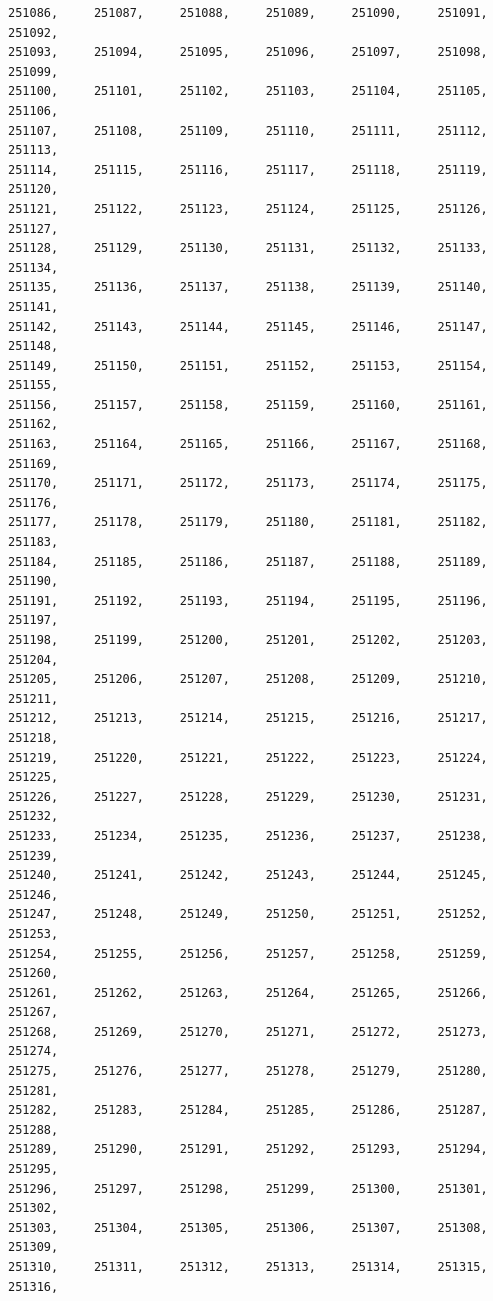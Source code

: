 \documentclass[a4paper,11pt]{report}
\begin{document}
\begin{verbatim}
251086,     251087,     251088,     251089,     251090,     251091,     251092,
251093,     251094,     251095,     251096,     251097,     251098,     251099,
251100,     251101,     251102,     251103,     251104,     251105,     251106,
251107,     251108,     251109,     251110,     251111,     251112,     251113,
251114,     251115,     251116,     251117,     251118,     251119,     251120,
251121,     251122,     251123,     251124,     251125,     251126,     251127,
251128,     251129,     251130,     251131,     251132,     251133,     251134,
251135,     251136,     251137,     251138,     251139,     251140,     251141,
251142,     251143,     251144,     251145,     251146,     251147,     251148,
251149,     251150,     251151,     251152,     251153,     251154,     251155,
251156,     251157,     251158,     251159,     251160,     251161,     251162,
251163,     251164,     251165,     251166,     251167,     251168,     251169,
251170,     251171,     251172,     251173,     251174,     251175,     251176,
251177,     251178,     251179,     251180,     251181,     251182,     251183,
251184,     251185,     251186,     251187,     251188,     251189,     251190,
251191,     251192,     251193,     251194,     251195,     251196,     251197,
251198,     251199,     251200,     251201,     251202,     251203,     251204,
251205,     251206,     251207,     251208,     251209,     251210,     251211,
251212,     251213,     251214,     251215,     251216,     251217,     251218,
251219,     251220,     251221,     251222,     251223,     251224,     251225,
251226,     251227,     251228,     251229,     251230,     251231,     251232,
251233,     251234,     251235,     251236,     251237,     251238,     251239,
251240,     251241,     251242,     251243,     251244,     251245,     251246,
251247,     251248,     251249,     251250,     251251,     251252,     251253,
251254,     251255,     251256,     251257,     251258,     251259,     251260,
251261,     251262,     251263,     251264,     251265,     251266,     251267,
251268,     251269,     251270,     251271,     251272,     251273,     251274,
251275,     251276,     251277,     251278,     251279,     251280,     251281,
251282,     251283,     251284,     251285,     251286,     251287,     251288,
251289,     251290,     251291,     251292,     251293,     251294,     251295,
251296,     251297,     251298,     251299,     251300,     251301,     251302,
251303,     251304,     251305,     251306,     251307,     251308,     251309,
251310,     251311,     251312,     251313,     251314,     251315,     251316,

\end{verbatim}
\end{document}
